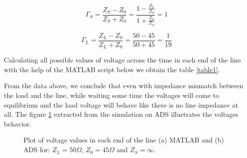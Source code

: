 \begin{equation} \label{gammaS}
    \Gamma_S = \frac{Z_S - Z_0}{Z_S + Z_0} = \frac{1 - \frac{Z_0}{Z_S}}{1 + \frac{Z_0}{Z_S}} = 1
\end{equation}

\begin{equation} \label{gammaL}
    \Gamma_L= \frac{Z_L - Z_0}{Z_L + Z_0} = \frac{50 - 45}{50 + 45} = \frac{1}{19} 
\end{equation}

Calculating all possible values of voltage across the time in each end of the line with the help of the MATLAB script below we obtain the table \ref{table1}.





From the data above, we conclude that even with impedance mismatch between the load and the line, while waiting some time the voltages will come to equilibrium and the load voltage will behave like there is no line impedance at all. The figure \ref{ads:plot:voltages45} extracted from the simulation on ADS illustrates the voltages behavior.

\begin{figure}[H]
\begin{center}
\end{center}
\caption{Plot of voltage values in each end of the line (a) MATLAB and (b) ADS for: $Z_L = 50 \Omega$, $Z_0 = 45 \Omega$ and $Z_S = \infty$.}
\label{ads:plot:voltages45} 
\end{figure}

